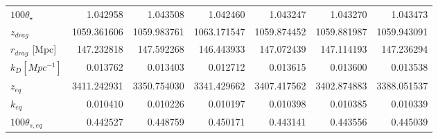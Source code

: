 \begin{tabular}{lrrrrrr}
$100\theta_{\star}$ & 1.042958 & 1.043508 & 1.042460 & 1.043247 & 1.043270 & 1.043473 \\
$z_{drag}$ & 1059.361606 & 1059.983761 & 1063.171547 & 1059.874452 & 1059.881987 & 1059.943091 \\
$r_{drag}$ [Mpc] & 147.232818 & 147.592268 & 146.443933 & 147.072439 & 147.114193 & 147.236294 \\
$k_D [Mpc^{-1}]$ & 0.013762 & 0.013403 & 0.012712 & 0.013615 & 0.013600 & 0.013538 \\
$z_{eq}$ & 3411.242931 & 3350.754030 & 3341.429662 & 3407.417562 & 3402.874883 & 3388.051537 \\
$k_{eq}$ & 0.010410 & 0.010226 & 0.010197 & 0.010398 & 0.010385 & 0.010339 \\
$100\theta_{s,eq}$ & 0.442527 & 0.448759 & 0.450171 & 0.443141 & 0.443556 & 0.445039 \\
\bottomrule
\end{tabular}
